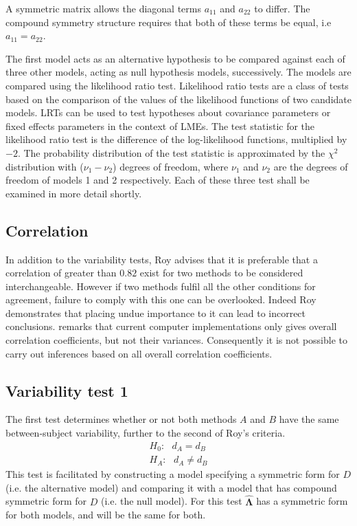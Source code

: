 \documentclass[12pt, a4paper]{report}
\theoremstyle{plain}
\theoremstyle{definition}
\theoremstyle{remark}
\begin{document}
A symmetric matrix allows the diagonal terms $a_{11}$ and $a_{22}$ to differ. The compound symmetry structure requires that both of these terms be equal, i.e $a_{11} = a_{22}$.

The first model acts as an alternative hypothesis to be compared against each of three other models, acting as null hypothesis models, successively. The models are compared using the likelihood ratio test. Likelihood ratio tests are a class of tests based on the comparison of the values of the likelihood functions of two candidate models. LRTs can be used to test hypotheses about covariance parameters or fixed effects parameters in the context of LMEs. The test statistic for the likelihood ratio test is the difference of the log-likelihood functions, multiplied by $-2$.
The probability distribution of the test statistic is approximated by the $\chi^2$ distribution with ($\nu_{1} - \nu_{2}$) degrees of freedom, where $\nu_{1}$ and $\nu_{2}$ are the degrees of freedom of models 1 and 2 respectively. Each of these three test shall be examined in more detail shortly.

\subsection{Correlation}
In addition to the variability tests, Roy advises that it is preferable that a correlation of greater than $0.82$ exist for two methods to be considered interchangeable. However if two methods fulfil all the other conditions for agreement, failure to comply with this one can be overlooked. Indeed Roy demonstrates that placing undue importance to it can lead to incorrect conclusions. \citet{roy} remarks that current computer implementations only gives overall correlation coefficients, but not their variances. Consequently it is not possible to carry out inferences based on all overall correlation coefficients.

\subsection{Variability test 1}
The first test determines whether or not both methods $A$ and $B$ have the same between-subject variability, further to the second of Roy's criteria.
\begin{eqnarray*}
H_{0}: \mbox{ }d_{A}  = d_{B} \\
H_{A}: \mbox{ }d_{A}  \neq d_{B}
\end{eqnarray*}
This test is facilitated by constructing a model specifying a symmetric form for $D$ (i.e. the alternative model) and comparing it with a model that has compound symmetric form for $D$ (i.e. the null model). For this test $\boldsymbol{\hat{\Lambda}}$ has a symmetric form for both models, and will be the same for both.
\end{document}
